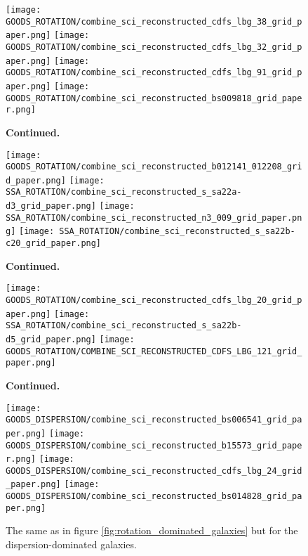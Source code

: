 \documentclass[fleqn,usenatbib]{mnras}
\begin{document}
\begin{figure*}\ContinuedFloat
    \centering

    \texttt{[image: GOODS\_ROTATION/combine\_sci\_reconstructed\_cdfs\_lbg\_38\_grid\_paper.png]}
    \texttt{[image: GOODS\_ROTATION/combine\_sci\_reconstructed\_cdfs\_lbg\_32\_grid\_paper.png]}
    \texttt{[image: GOODS\_ROTATION/combine\_sci\_reconstructed\_cdfs\_lbg\_91\_grid\_paper.png]}
    \texttt{[image: GOODS\_ROTATION/combine\_sci\_reconstructed\_bs009818\_grid\_paper.png]}

    \caption{\textbf{Continued.}}

\end{figure*}


\begin{figure*}\ContinuedFloat
    \centering

    \texttt{[image: GOODS\_ROTATION/combine\_sci\_reconstructed\_b012141\_012208\_grid\_paper.png]}
    \texttt{[image: SSA\_ROTATION/combine\_sci\_reconstructed\_s\_sa22a-d3\_grid\_paper.png]}
    \texttt{[image: SSA\_ROTATION/combine\_sci\_reconstructed\_n3\_009\_grid\_paper.png]}
    \texttt{[image: SSA\_ROTATION/combine\_sci\_reconstructed\_s\_sa22b-c20\_grid\_paper.png]}

    \caption{\textbf{Continued.}}

\end{figure*}

\begin{figure*}\ContinuedFloat
\centering

    \texttt{[image: GOODS\_ROTATION/combine\_sci\_reconstructed\_cdfs\_lbg\_20\_grid\_paper.png]}
    \texttt{[image: SSA\_ROTATION/combine\_sci\_reconstructed\_s\_sa22b-d5\_grid\_paper.png]}
    \texttt{[image: GOODS\_ROTATION/COMBINE\_SCI\_RECONSTRUCTED\_CDFS\_LBG\_121\_grid\_paper.png]}
    \caption{\textbf{Continued.}}

\end{figure*}

\begin{figure*}
    \centering

    \texttt{[image: GOODS\_DISPERSION/combine\_sci\_reconstructed\_bs006541\_grid\_paper.png]}
    \texttt{[image: GOODS\_DISPERSION/combine\_sci\_reconstructed\_b15573\_grid\_paper.png]}
    \texttt{[image: GOODS\_DISPERSION/combine\_sci\_reconstructed\_cdfs\_lbg\_24\_grid\_paper.png]}
    \texttt{[image: GOODS\_DISPERSION/combine\_sci\_reconstructed\_bs014828\_grid\_paper.png]}

    \caption{The same as in figure \protect\ref{fig:rotation_dominated_galaxies} but for the dispersion-dominated galaxies.}
    \label{fig:dispersion_dominated_galaxies}

\end{figure*}
\end{document}
